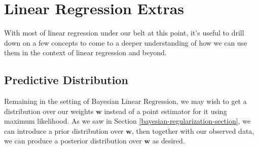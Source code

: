 \section{Linear Regression Extras}
With most of linear regression under our belt at this point, it's useful to drill down on a few concepts to come to a deeper understanding of how we can use them in the context of linear regression and beyond.

\subsection{Predictive Distribution}
Remaining in the setting of Bayesian Linear Regression, we may wish to get a distribution over our weights $\textbf{w}$ instead of a point estimator for it using maximum likelihood. As we saw in Section \ref{bayesian-regularization-section}, we can introduce a prior distribution over $\textbf{w}$, then together with our observed data, we can produce a posterior distribution over $\textbf{w}$ as desired.

